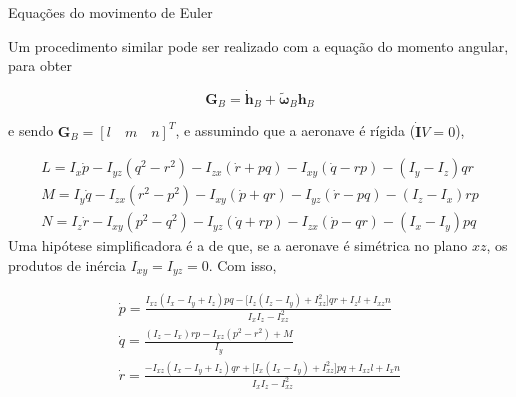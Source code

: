\documentclass{beamer}
\newcommand{\jindent}{\justifying\setlength{\parindent}{1.5em}}
\begin{document}
\begin{frame}{Equações do movimento de Euler}

    \jindent
    Um procedimento similar pode ser realizado com a equação do momento angular, para obter

    \begin{equation*}
        \mathbf G_B = \dot{\mathbf h}_B + \tilde{\boldsymbol{\omega}}_B \mathbf h_B
    \end{equation*}

    \justifying e sendo $\mathbf G_B = [l \quad m \quad n]^T$, e assumindo que a aeronave é rígida ($\dot{\mathbf I}V = 0$), 
    
    \begin{gather*}
    L = I_x \dot{p} - I_{yz}(q^2 - r^2) - I_{zx}(\dot{r} + pq) - I_{xy}(\dot{q} - rp) - (I_y - I_z)qr \\
    M = I_y \dot{q} - I_{zx}(r^2 - p^2) - I_{xy}(\dot{p} + qr) - I_{yz}(\dot{r} - pq) - (I_z - I_x)rp \\
    N = I_z \dot{r} - I_{xy}(p^2 - q^2) - I_{yz}(\dot{q} + rp) - I_{zx}(\dot{p} - qr) - (I_x - I_y)pq
    \end{gather*}
        \jindent
    Uma hipótese simplificadora é a de que, se a aeronave é simétrica no plano $xz$, os produtos de inércia $I_{xy} = I_{yz} = 0$. Com isso,

    \begin{gather*}
    \dot{p} = \frac{I_{xz}(I_x - I_y + I_z)pq - \big[I_z(I_z - I_y) + I_{xz}^2\big]qr + I_z l + I_{xz} n}{I_x I_z - I_{xz}^2} \\
    \dot{q} = \frac{(I_z - I_x)rp - I_{xz}(p^2 - r^2) + M}{I_y} \\
    \dot{r} = \frac{-I_{xz}(I_x - I_y + I_z)qr + \big[I_x(I_x - I_y) + I_{xz}^2\big]pq + I_{xz} l + I_x n}{I_x I_z - I_{xz}^2}
    \end{gather*}

\end{frame}

\end{document}
